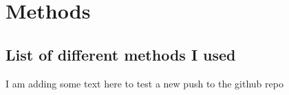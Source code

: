 \chapter{Methods}

\section{List of different methods I used}

I am adding some text here to test a new push to the github repo